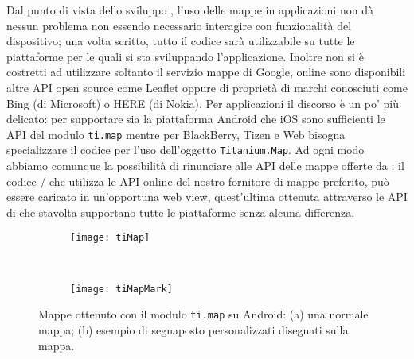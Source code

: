             Dal punto di vista dello sviluppo \crossplat{}, l'uso delle mappe in
            applicazioni \pg{} non dà nessun problema non essendo necessario
            interagire con funzionalità del dispositivo; una volta scritto,
            tutto il codice sarà utilizzabile su tutte le piattaforme per le
            quali si sta sviluppando l'applicazione. Inoltre non si è
            costretti ad utilizzare soltanto il servizio mappe di Google, online
            sono disponibili altre API \js{} open source come Leaflet oppure
            di proprietà di marchi conosciuti come Bing (di Microsoft) o HERE
            (di Nokia). Per applicazioni \tisdk{} il discorso è un po' più
            delicato: per supportare sia la piattaforma Android che iOS sono
            sufficienti le API del modulo \texttt{ti.map} mentre per BlackBerry,
            Tizen e Web bisogna specializzare il codice per l'uso dell'oggetto
            \texttt{Titanium.Map}. Ad ogni modo abbiamo comunque la possibilità
            di rinunciare alle API delle mappe offerte da \tisdk{}: il codice
            \js{}/\html{} che utilizza le API online del nostro fornitore di
            mappe preferito, può essere caricato in un'opportuna web view,
            quest'ultima ottenuta attraverso le API di \tisdk{} che stavolta
            supportano tutte le piattaforme senza alcuna differenza.
            \begin{figure}[h]
                \centering
                \begin{subfigure}[b]{0.485\textwidth}
                    \texttt{[image: tiMap]}
                    \caption{}
                    \label{fig:tiMap}
                \end{subfigure}
                ~
                \begin{subfigure}[b]{0.485\textwidth}
                    \texttt{[image: tiMapMark]}
                    \caption{}
                    \label{fig:tiMapMark}
                \end{subfigure}
                \caption{
                    Mappe ottenuto con il modulo \texttt{ti.map} su Android: (a)
                    una normale mappa; (b) esempio di segnaposto personalizzati
                    disegnati sulla mappa.
                }
                \label{fig:TiMaps}
            \end{figure}

